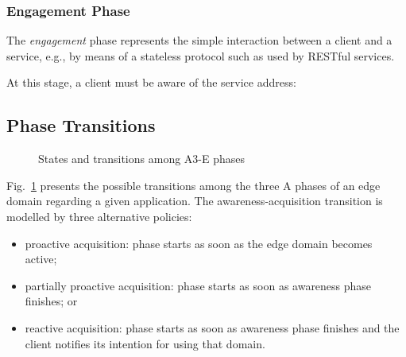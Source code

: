 \subsubsection{Engagement Phase}\label{sec:A3-E-engagement}

The \textit{engagement} phase represents the simple interaction between a client and a service, e.g., by means of a stateless protocol such as used by RESTful services.

At this stage, a client must be aware of the service address: 

\subsection{Phase Transitions}

\begin{figure}[htbp]
	\raggedright
	\hfill
	
	\hfill
	\caption{States and transitions among A3-E phases} \label{fig:A3-E-phases}
\end{figure}

Fig.~\ref{fig:A3-E-phases} presents the possible transitions among the three A phases of an edge domain regarding a given application. The awareness-acquisition transition is modelled by three alternative policies: 

\begin{itemize}

\item proactive acquisition: phase starts as soon as the edge domain becomes active; 

\item partially proactive acquisition: phase starts as soon as awareness phase finishes; or

\item reactive acquisition: phase starts as soon as awareness phase finishes and the client notifies its intention for using that domain.

\end{itemize}

